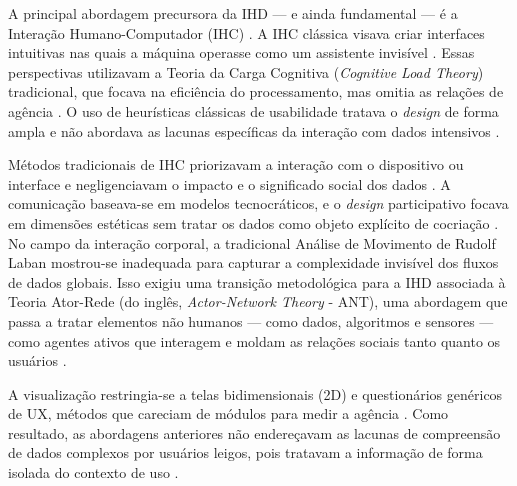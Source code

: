 \documentclass[
	12pt,				%
	oneside,			%
	a4paper,			%
	english,			%
	brazil				%
	]{abntex2ppgsi}
\begin{document}
    A principal abordagem precursora da IHD — e ainda fundamental — é a Interação Humano-Computador (IHC) \cite{Coleti2024, Sailaja2021, Victorelli2020Human, Strey2019Human}. A IHC clássica visava criar interfaces intuitivas nas quais a máquina operasse como um assistente invisível \cite{Konomi2022, Sailaja2021, Alhakamy2021}. Essas perspectivas utilizavam a Teoria da Carga Cognitiva (\textit{Cognitive Load Theory}) tradicional, que focava na eficiência do processamento, mas omitia as relações de agência \cite{cezar2023cognitive}. O uso de heurísticas clássicas de usabilidade tratava o \textit{design} de forma ampla e não abordava as lacunas específicas da interação com dados intensivos \cite{Capeleti2024Human}. 

    Métodos tradicionais de IHC priorizavam a interação com o dispositivo ou interface e negligenciavam o impacto e o significado social dos dados \cite{Belizario2023Interacao}. A comunicação baseava-se em modelos tecnocráticos, e o \textit{design} participativo focava em dimensões estéticas sem tratar os dados como objeto explícito de cocriação \cite{ferreira2024connecting, seidelin2020foregrounding}. No campo da interação corporal, a tradicional Análise de Movimento de Rudolf Laban mostrou-se inadequada para capturar a complexidade invisível dos fluxos de dados globais. Isso exigiu uma transição metodológica para a IHD associada à Teoria Ator-Rede (do inglês, \textit{Actor-Network Theory} - ANT), uma abordagem que passa a tratar elementos não humanos — como dados, algoritmos e sensores — como agentes ativos que interagem e moldam as relações sociais tanto quanto os usuários \cite{Parviainen2016}.

    A visualização restringia-se a telas bidimensionais (2D) e questionários genéricos de UX, métodos que careciam de módulos para medir a agência \cite{DeKreij2024, Friedman2024, Burzio2024, Ranasinghe2023, Lee-Smith2023, Nelson2023, capeleti2023heuristic, Capeleti2023Usability, Victorelli2023Evaluating, Paredes2022317, Elhamdadi2022, Xia2021, Barreto2018}. Como resultado, as abordagens anteriores não endereçavam as lacunas de compreensão de dados complexos por usuários leigos, pois tratavam a informação de forma isolada do contexto de uso \cite{Belizario2023Interacao}.
\end{document}
